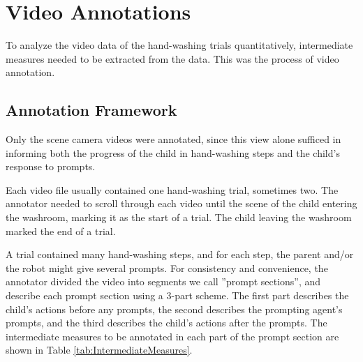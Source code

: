 \section{Video Annotations}
To analyze the video data of the hand-washing trials quantitatively, intermediate measures needed to be extracted from the data.  This was the process of video annotation.



\subsection{Annotation Framework}
\label{sec:AnnotationFramework}
Only the scene camera videos were annotated, since this view alone sufficed in informing both the progress of the child in hand-washing steps and the child's response to prompts.

Each video file usually contained one hand-washing trial, sometimes two.  The annotator needed to scroll through each video until the scene of the child entering the washroom, marking it as the start of a trial.  The child leaving the washroom marked the end of a trial.

A trial contained many hand-washing steps, and for each step, the parent and/or the robot might give several prompts.  For consistency and convenience, the annotator divided the video into segments we call ''prompt sections'', and describe each prompt section using a 3-part scheme.  The first part describes the child's actions before any prompts, the second describes the prompting agent's prompts, and the third describes the child's actions after the prompts.  The intermediate measures to be annotated in each part of the prompt section are shown in Table \ref{tab:IntermediateMeasures}.

